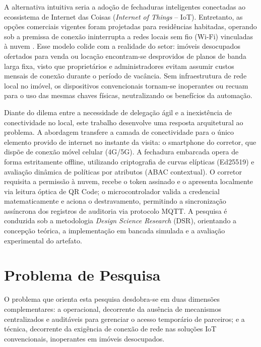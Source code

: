 A alternativa intuitiva seria a adoção de fechaduras inteligentes conectadas ao ecossistema de Internet das Coisas (\textit{Internet of Things} -- IoT). Entretanto, as opções comerciais vigentes foram projetadas para residências habitadas, operando sob a premissa de conexão ininterrupta a redes locais sem fio (Wi-Fi) vinculadas à nuvem \cite{vardakis2024}. Esse modelo colide com a realidade do setor: imóveis desocupados ofertados para venda ou locação encontram-se desprovidos de planos de banda larga fixa, visto que proprietários e administradores evitam assumir custos mensais de conexão durante o período de vacância. Sem infraestrutura de rede local no imóvel, os dispositivos convencionais tornam-se inoperantes ou recuam para o uso das mesmas chaves físicas, neutralizando os benefícios da automação.

Diante do dilema entre a necessidade de delegação ágil e a inexistência de conectividade no local, este trabalho desenvolve uma resposta arquitetural ao problema. A abordagem transfere a camada de conectividade para o único elemento provido de internet no instante da visita: o smartphone do corretor, que dispõe de conexão móvel celular (4G/5G). A fechadura embarcada opera de forma estritamente offline, utilizando criptografia de curvas elípticas (Ed25519) e avaliação dinâmica de políticas por atributos (ABAC contextual). O corretor requisita a permissão à nuvem, recebe o token assinado e o apresenta localmente via leitura óptica de QR Code; o microcontrolador valida a credencial matematicamente e aciona o destravamento, permitindo a sincronização assíncrona dos registros de auditoria via protocolo MQTT. A pesquisa é conduzida sob a metodologia \textit{Design Science Research} (DSR), orientando a concepção teórica, a implementação em bancada simulada e a avaliação experimental do artefato.

\section{Problema de Pesquisa}
\label{sec:problema}

O problema que orienta esta pesquisa desdobra-se em duas dimensões complementares: a operacional, decorrente da ausência de mecanismos centralizados e auditáveis para gerenciar o acesso temporário de parceiros; e a técnica, decorrente da exigência de conexão de rede nas soluções IoT convencionais, inoperantes em imóveis desocupados.

